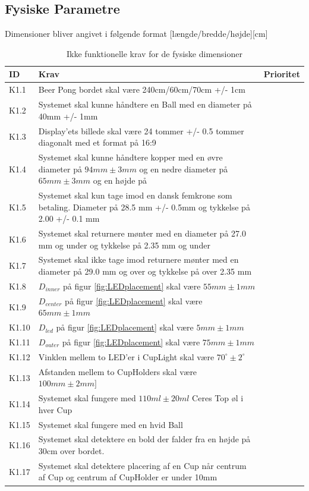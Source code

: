 \documentclass[Kravspecifikation/Kravspec_Main.tex]{subfiles}
\begin{document}
\subsection{Fysiske Parametre}
Dimensioner bliver angivet i følgende format [længde/bredde/højde][cm]
\begin{table}[H]
\begin{tabular}{|L{0.1\textwidth}|L{0.75\textwidth}|L{0.15\textwidth}|}
\hline
\textbf{ID} & \textbf{Krav} & \textbf{Prioritet} \\ \hline
K1.1 & Beer Pong bordet skal være 240cm/60cm/70cm +/- 1cm  &  \\ \hline
K1.2 & Systemet skal kunne håndtere en Ball med en diameter på 40mm +/- 1mm&  \\ \hline
K1.3 & Display'ets billede skal være 24 tommer +/- 0.5 tommer diagonalt med et format på 16:9&  \\ \hline
K1.4 & Systemet skal kunne håndtere kopper med en øvre diameter på $94\si{mm} \pm 3\si{mm}$ og en nedre diameter på $65\si{mm} \pm 3\si{mm}$  og en højde på & \\ \hline
K1.5 & Systemet skal kun tage imod en dansk femkrone som betaling. Diameter på 28.5 mm +/- 0.5mm og tykkelse på 2.00 +/- 0.1 mm & \\ \hline
K1.6 & Systemet skal returnere mønter med en diameter på 27.0 mm og under og tykkelse på 2.35 mm og under & \\ \hline
K1.7 & Systemet skal ikke tage imod returnere mønter med en diameter på 29.0 mm og over og tykkelse på over 2.35 mm& \\ \hline
K1.8 & $D_{inner}$ på figur \ref{fig:LEDplacement} skal være $55\si{mm} \pm 1\si{mm}$  & \\ \hline
K1.9 & $D_{center}$ på figur \ref{fig:LEDplacement} skal være $65\si{mm} \pm 1\si{mm}$  & \\ \hline
K1.10 & $D_{led}$ på figur \ref{fig:LEDplacement} skal være $5\si{mm} \pm 1\si{mm}$  & \\ \hline
K1.11 & $D_{outer}$ på figur \ref{fig:LEDplacement} skal være $75\si{mm} \pm 1\si{mm}$   & \\ \hline
K1.12 & Vinklen mellem to LED'er i CupLight skal være $70^{\circ} \pm 2^{\circ}$ & \\ \hline
K1.13 & Afstanden mellem to CupHolders skal være $100\si{mm} \pm 2\si{mm}]$ & \\ \hline
K1.14 & Systemet skal fungere med $110\si{ml} \pm 20\si{ml}$ Ceres Top øl i hver Cup & \\ \hline
K1.15 & Systemet skal fungere med en hvid Ball & \\ \hline
K1.16 & Systemet skal detektere en bold der falder fra en højde på 30cm over bordet. & \\ \hline 
K1.17 & Systemet skal detektere placering af en Cup når centrum af Cup og centrum af CupHolder er under 10mm & \\ \hline

\end{tabular}
\caption{Ikke funktionelle krav for de fysiske dimensioner}
\label{tab:fysiske_dimensioner}
\end{table}
\end{document}
